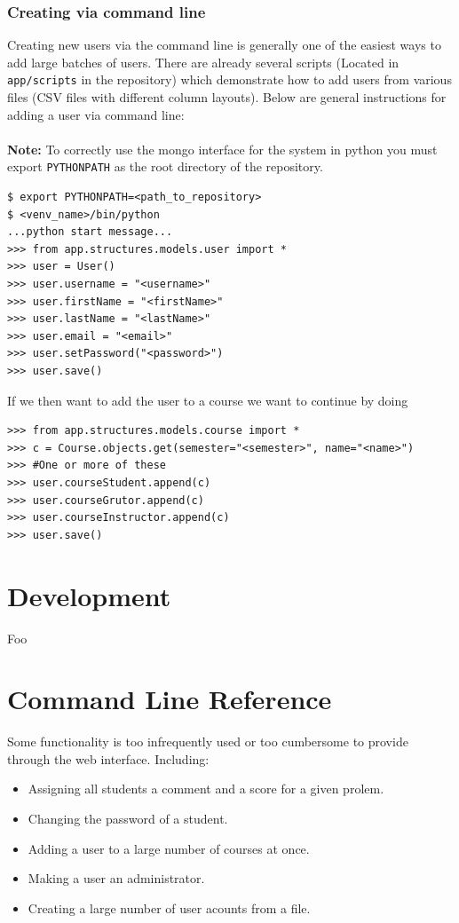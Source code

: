 \documentclass[11pt]{report}
\begin{document}
\subsection{Creating via command line}
Creating new users via the command line is generally one of the easiest ways to add large batches of users.
There are already several scripts (Located in \verb|app/scripts| in the repository) which demonstrate how to
add users from various files (CSV files with different column layouts). Below are general instructions for adding
a user via command line:
\\
\\
\noindent\textbf{Note:} To correctly use the mongo interface for the system in python you must export \verb|PYTHONPATH| as the root directory of the repository.

\begin{verbatim}
$ export PYTHONPATH=<path_to_repository>
$ <venv_name>/bin/python
...python start message...
>>> from app.structures.models.user import *
>>> user = User()
>>> user.username = "<username>"
>>> user.firstName = "<firstName>"
>>> user.lastName = "<lastName>"
>>> user.email = "<email>"
>>> user.setPassword("<password>")
>>> user.save()
\end{verbatim}

\noindent If we then want to add the user to a course we want to continue by doing

\begin{verbatim}
>>> from app.structures.models.course import *
>>> c = Course.objects.get(semester="<semester>", name="<name>")
>>> #One or more of these
>>> user.courseStudent.append(c)
>>> user.courseGrutor.append(c)
>>> user.courseInstructor.append(c)
>>> user.save()
\end{verbatim}




\chapter{Development}
\label{ch:develop}
Foo

\chapter{Command Line Reference}
Some functionality is too infrequently used or too cumbersome to provide through
the web interface. Including:

\begin{itemize}
  \item Assigning all students a comment and a score for a given prolem.
  \item Changing the password of a student.
  \item Adding a user to a large number of courses at once.
  \item Making a user an administrator.
  \item Creating a large number of user acounts from a file.
\end{itemize}
\end{document}
